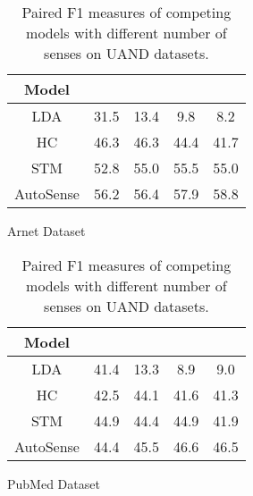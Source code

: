 \documentclass[letterpaper]{article} \usepackage{aaai19}
\begin{document}
\begin{table}[]
    \centering
    \begin{subtable}{0.47\textwidth}
    \centering
    \begin{tabular}{|c|cccc|}
        \hline
        Model &  &  &  &  \\
        \hline
        LDA & 31.5 & 13.4 & 9.8 & 8.2 \\
        HC & 46.3 & 46.3 & 44.4 & 41.7 \\
        STM & 52.8 & 55.0 & 55.5 & 55.0 \\
        AutoSense & 56.2 & 56.4 & 57.9 & 58.8 \\
        \hline
    \end{tabular}
    \caption{Arnet Dataset}
    \end{subtable}
	\newline
    \vspace*{2pt}
    \newline
    \begin{subtable}{0.47\textwidth}
    \centering
    \begin{tabular}{|c|cccc|}
        \hline
        Model &  &  &  &  \\
        \hline
        LDA & 41.4 & 13.3 & 8.9 & 9.0 \\
        HC & 42.5 & 44.1 & 41.6 & 41.3 \\
        STM & 44.9 & 44.4 & 44.9 & 41.9 \\
        AutoSense & 44.4 & 45.5 & 46.6 & 46.5 \\
        \hline
    \end{tabular}
    \caption{PubMed Dataset}
    \end{subtable}
    \caption{Paired F1 measures of competing models with different number of senses  on UAND datasets.}
	\label{fig:andresults}
\end{table}

\begin{comment}
\begin{figure}[t]
	\centering
	\begin{subfigure}{0.4\textwidth}
        \centering
    	\texttt{[image: ../arnet3]}
    	\caption{Arnet Dataset}
	\end{subfigure}
	\begin{subfigure}{0.4\textwidth}
        \centering
    	\texttt{[image: ../pubmed3]}
		\caption{PubMed Dataset}
	\end{subfigure}
	\caption{Paired F1 measures of competing models with different number of senses . We condense the y-axis 
leaving some bars unseen.
	The number above the bar corresponds to the real score.}
	\label{fig:andresults}
\end{figure}
\end{comment}
\end{document}
